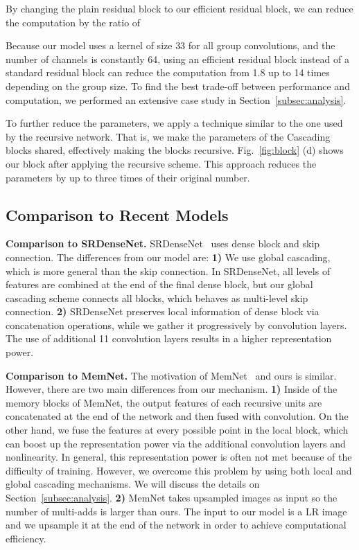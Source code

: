 \documentclass[runningheads]{llncs}
\begin{document}
By changing the plain residual block to our efficient residual block, we can reduce the computation by the ratio of



Because our model uses a kernel of size 33 for all group convolutions, and the number of channels is constantly 64, using an efficient residual block instead of a standard residual block can reduce the computation from 1.8 up to 14 times depending on the group size. To find the best trade-off between performance and computation, we performed an extensive case study in Section~\ref{subsec:analysis}.

To further reduce the parameters, we apply a technique similar to the one used by the recursive network. That is, we make the parameters of the Cascading blocks shared, effectively making the blocks recursive. Fig.~\ref{fig:block}  (d) shows our block after applying the recursive scheme. This approach reduces the parameters by up to three times of their original number.

\subsection{Comparison to Recent Models}
\textbf{Comparison to SRDenseNet.} SRDenseNet~\cite{srdense} uses dense block and skip connection. The differences from our model are: \textbf{1)} We use global cascading, which is more general than the skip connection. In SRDenseNet, all levels of features are combined at the end of the final dense block, but our global cascading scheme connects all blocks, which behaves as multi-level skip connection. \textbf{2)} SRDenseNet preserves local information of dense block via concatenation operations, while we gather it progressively by  convolution layers. The use of additional 11 convolution layers results in a higher representation power.

\noindent\textbf{Comparison to MemNet.} The motivation of MemNet~\cite{memnet} and ours is similar. However, there are two main differences from our mechanism. \textbf{1)} Inside of the memory blocks of MemNet, the output features of each recursive units are concatenated at the end of the network and then fused with  convolution. On the other hand, we fuse the features at every possible point in the local block, which can boost up the representation power via the additional convolution layers and nonlinearity. In general, this representation power is often not met because of the difficulty of training. However, we overcome this problem by using both local and global cascading mechanisms. We will discuss the details on Section~\ref{subsec:analysis}.
\textbf{2)} MemNet takes upsampled images as input so the number of multi-adds is larger than ours. The input to our model is a LR image and we upsample it at the end of the network in order to achieve computational efficiency.
\end{document}
